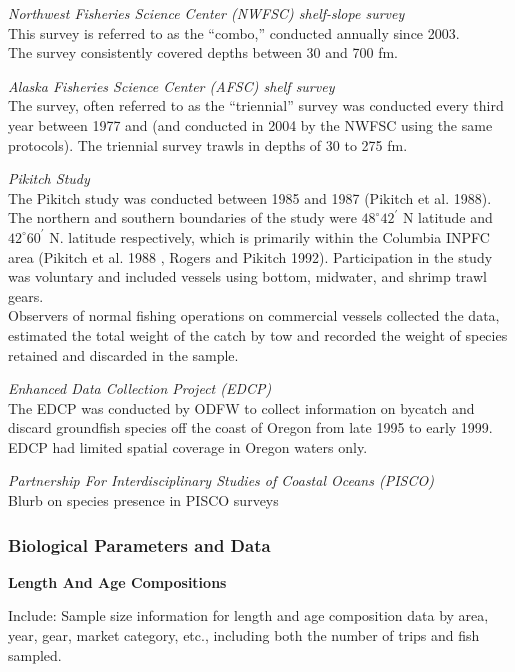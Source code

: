\documentclass[12pt,]{article}
\begin{document}
\emph{Northwest Fisheries Science Center (NWFSC) shelf-slope survey}\\
This survey is referred to as the ``combo,'' conducted annually since
2003.\\
The survey consistently covered depths between 30 and 700 fm.

\emph{Alaska Fisheries Science Center (AFSC) shelf survey}\\
The survey, often referred to as the ``triennial'' survey was conducted
every third year between 1977 and (and conducted in 2004 by the NWFSC
using the same protocols). The triennial survey trawls in depths of 30
to 275 fm.

\emph{Pikitch Study}\\
The Pikitch study was conducted between 1985 and 1987 (Pikitch et al.
1988). The northern and southern boundaries of the study were
\(48^\circ 42^\prime\) N latitude and \(42^\circ 60^\prime\) N. latitude
respectively, which is primarily within the Columbia INPFC area (Pikitch
et al. 1988 , Rogers and Pikitch 1992). Participation in the study was
voluntary and included vessels using bottom, midwater, and shrimp trawl
gears.\\
Observers of normal fishing operations on commercial vessels collected
the data, estimated the total weight of the catch by tow and recorded
the weight of species retained and discarded in the sample.

\emph{Enhanced Data Collection Project (EDCP)}\\
The EDCP was conducted by ODFW to collect information on bycatch and
discard groundfish species off the coast of Oregon from late 1995 to
early 1999.\\
EDCP had limited spatial coverage in Oregon waters only.

\emph{Partnership For Interdisciplinary Studies of Coastal Oceans
(PISCO)}\\
Blurb on species presence in PISCO surveys

\subsubsection{Biological Parameters and
Data}\label{biological-parameters-and-data}

\textbf{Length And Age Compositions}

Include: Sample size information for length and age composition data by
area, year, gear, market category, etc., including both the number of
trips and fish sampled.
\end{document}
